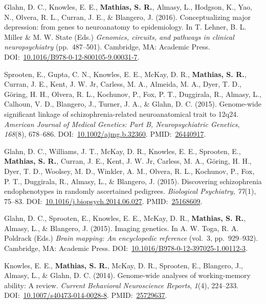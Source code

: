 \documentclass[10pt]{article}
\makeatletter
\newlength{\bibhang}
\newlength{\bibsep}
 {\@listi \global\bibsep\itemsep \global\advance\bibsep by\parsep}
\newenvironment{bibsection}%
        {\vspace{-\baselineskip}\begin{list}{}{%
       \setlength{\leftmargin}{\bibhang}%
       \setlength{\itemindent}{-\leftmargin}%
       \setlength{\itemsep}{\bibsep}%
       \setlength{\parsep}{\z@}%
        \setlength{\partopsep}{0pt}%
        \setlength{\topsep}{0pt}}}
        {\end{list}\vspace{-.6\baselineskip}}
\makeatother
\begin{document}
\begin{bibsection}
\item Glahn, D. C., Knowles, E. E., \textbf{Mathias, S. R.}, Almasy, L., Hodgson, K., Yao, N., Olvera, R. L., Curran, J. E., \& Blangero, J. (2016). Conceptualizing major depression: from genes to neuroanatomy to epidemiology. In T. Lehner, B. L. Miller \& M. W. State (Eds.) \emph{Genomics, circuits, and pathways in clinical neuropsychiatry} (pp.~487--501). Cambridge, MA: Academic Press. DOI:~\href{https://doi.org/10.1016/B978-0-12-800105-9.00031-7}{10.1016/B978-0-12-800105-9.00031-7}.
\item Sprooten, E., Gupta, C. N., Knowles, E. E., McKay, D. R., \textbf{Mathias, S. R.}, Curran, J. E., Kent, J. W. Jr, Carless, M. A., Almeida, M. A., Dyer, T. D., Göring, H. H., Olvera, R. L., Kochunov, P., Fox, P. T., Duggirala, R., Almasy, L., Calhoun, V. D., Blangero, J., Turner, J. A., \& Glahn, D. C. (2015). Genome-wide significant linkage of schizophrenia-related neuroanatomical trait to 12q24. \emph{American Journal of Medical Genetics: Part B, Neuropsychiatric Genetics}, \emph{168}(8), 678--686. DOI:~\href{https://doi.org/10.1002/ajmg.b.32360}{10.1002/ajmg.b.32360}. PMID:~\href{https://www.ncbi.nlm.nih.gov/pubmed/?term=26440917}{26440917}.
\item Glahn, D. C., Williams, J. T., McKay, D. R., Knowles, E. E., Sprooten, E., \textbf{Mathias, S. R.}, Curran, J. E., Kent, J. W. Jr, Carless, M. A., Göring, H. H., Dyer, T. D., Woolsey, M. D., Winkler, A. M., Olvera, R. L., Kochunov, P., Fox, P. T., Duggirala, R., Almasy, L., \& Blangero, J. (2015). Discovering schizophrenia endophenotypes in randomly ascertained pedigrees. \emph{Biological Psychiatry}, \emph{77}(1), 75--83. DOI:~\href{https://doi.org/10.1016/j.biopsych.2014.06.027}{10.1016/j.biopsych.2014.06.027}. PMID:~\href{https://www.ncbi.nlm.nih.gov/pubmed/?term=25168609}{25168609}.
\item Glahn, D. C., Sprooten, E., Knowles, E. E., McKay, D. R., \textbf{Mathias, S. R.}, Almasy, L., \& Blangero, J. (2015). Imaging genetics. In A. W. Toga, R. A. Poldrack (Eds.) \emph{Brain mapping: An encyclopedic reference} (vol.~3, pp.~929--932). Cambridge, MA: Academic Press. DOI:~\href{https://doi.org/10.1016/B978-0-12-397025-1.00112-3}{10.1016/B978-0-12-397025-1.00112-3}.
\item Knowles, E. E., \textbf{Mathias, S. R.}, McKay, D. R., Sprooten, E., Blangero, J., Almasy, L., \& Glahn, D. C. (2014). Genome-wide analyses of working-memory ability: A review. \emph{Current Behavioral Neuroscience Reports}, \emph{1}(4), 224--233. DOI:~\href{https://doi.org/10.1007/s40473-014-0028-8}{10.1007/s40473-014-0028-8}. PMID:~\href{https://www.ncbi.nlm.nih.gov/pubmed/?term=25729637}{25729637}.

\end{bibsection}
\end{document}
